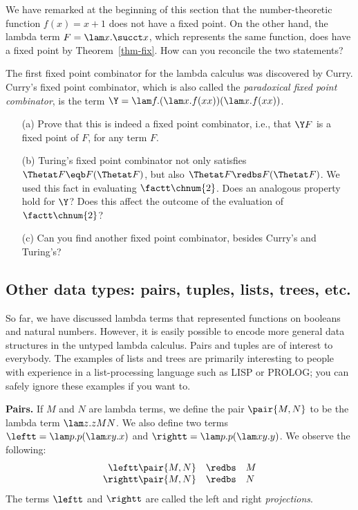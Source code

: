 \documentclass[12pt]{article}
\begin{document}
\begin{exercise}
  We have remarked at the beginning of this section that
  the number-theoretic function $f(x)=x+1$ does not have a
  fixed point. On the other hand, the lambda term $F=\lam x.\succt x$,
  which represents the same function, does have a fixed point by
  Theorem~\ref{thm-fix}. How can you reconcile the two statements?
\end{exercise}

\begin{exercise}
  The first fixed point combinator for the lambda calculus was discovered
  by Curry.  Curry's fixed point combinator, which is also called the
  {\em paradoxical fixed point combinator}, is the term $\Y=\lam f.(\lam
  x.f(xx))(\lam x.f(xx))$.
  \begin{enumerate}
  \item[(a)] Prove that this is indeed a fixed point combinator, i.e.,
    that $\Y F$ is a fixed point of $F$, for any term $F$. 
  \item[(b)] Turing's fixed point combinator not only satisfies $\Thetat
    F\eqb F(\Thetat F)$, but also $\Thetat F\redbs F(\Thetat F)$. We
    used this fact in evaluating $\factt\chnum{2}$. Does an analogous
    property hold for $\Y$? Does this affect the outcome of the
    evaluation of $\factt\chnum{2}$?
  \item[(c)] Can you find another fixed point combinator, besides Curry's
    and Turing's?
  \end{enumerate}
\end{exercise}

\subsection{Other data types: pairs, tuples, lists, trees, etc.}

So far, we have discussed lambda terms that represented functions on
booleans and natural numbers. However, it is easily possible to encode more
general data structures in the untyped lambda calculus. Pairs and
tuples are of interest to everybody. The examples of lists and trees
are primarily interesting to people with experience in a
list-processing language such as LISP or PROLOG; you can safely ignore
these examples if you want to.

{\bf Pairs.} If $M$ and $N$ are lambda terms, we define the pair
$\pair{M,N}$ to be the lambda term $\lam z.zMN$. We also define two
terms $\leftt=\lam p.p(\lam xy.x)$ and $\rightt=\lam p.p(\lam xy.y)$.
We observe the following:
\[  \begin{array}{rcl}
  \leftt \pair{M,N} &\redbs& M \\
  \rightt \pair{M,N} &\redbs& N
\end{array}
\]
The terms $\leftt$ and $\rightt$ are called the left and right {\em
  projections}.
\end{document}
